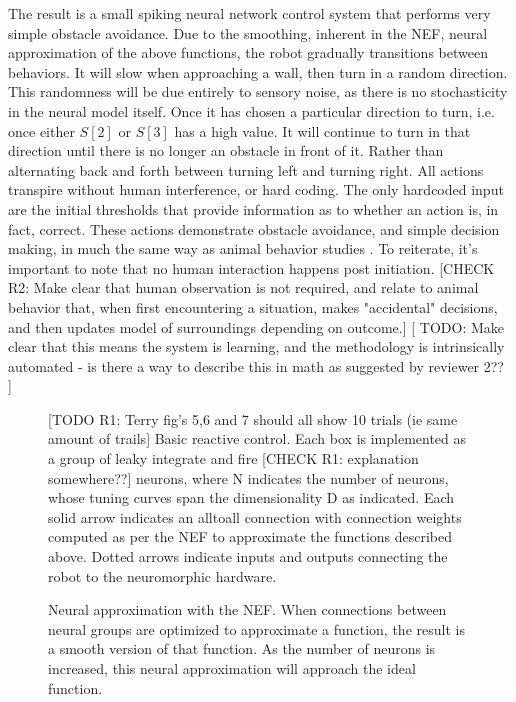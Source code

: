 \documentclass[conference]{IEEEtran}
\begin{document}
The result is a small spiking neural network control system that performs very simple obstacle avoidance. Due to the smoothing, inherent in the NEF, neural approximation of the above functions, the robot gradually transitions between behaviors. It will slow when approaching a wall, then turn in a random direction. This randomness will be due entirely to sensory noise, as there is no stochasticity in the neural model itself. Once it has chosen a particular direction to turn, i.e. once either $S[2]$ or $S[3]$ has a high value. It will continue to turn in that direction until there is no longer an obstacle in front of it. Rather than alternating back and forth between turning left and turning right. All actions transpire without human interference, or hard coding. The only hardcoded input are the initial thresholds that provide information as to whether an action is, in fact, correct. These actions demonstrate obstacle avoidance, and simple decision making, in much the same way as animal behavior studies  \cite{kim2007encoding}. To reiterate, it's important to note that no human interaction happens post initiation. [CHECK R2: Make clear that human observation is not required, and relate to animal behavior that, when first encountering a situation, makes "accidental" decisions, and then updates model of surroundings depending on outcome.] [ TODO: Make clear that this means the system is learning, and the methodology is intrinsically automated - is there a way to describe this in math as suggested by reviewer 2?? ]


\begin{figure}[!t]
\centering
\caption{[TODO R1: Terry fig's 5,6 and 7 should all show 10 trials (ie same amount of trails] Basic reactive control. Each box is implemented as a group of leaky integrate and fire [CHECK R1: explanation somewhere??] neurons, where N indicates the number of neurons, whose tuning curves span the dimensionality D as indicated. Each solid arrow indicates an alltoall connection with connection weights computed as per the NEF to approximate the functions described above. Dotted arrows indicate inputs
and outputs connecting the robot to the neuromorphic hardware.}
\label{React}
\end{figure}

\begin{figure}[!t]
\centering
\caption{Neural approximation with the NEF. When connections between neural groups are optimized to approximate a function, the result is a smooth version of that function. As the number of neurons is increased, this neural approximation will approach the ideal function.}
\label{NEF}
\end{figure}
\end{document}
